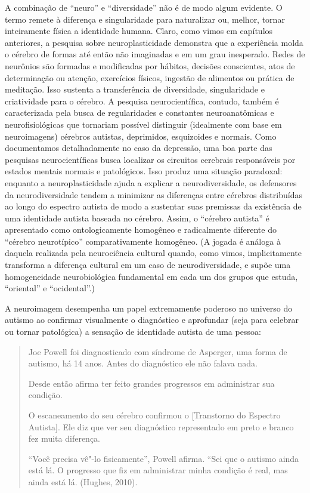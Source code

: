 A combinação de ``neuro'' e ``diversidade'' não é de modo algum
evidente. O termo remete à diferença e singularidade para naturalizar
ou, melhor, tornar inteiramente física a identidade humana. Claro, como
vimos em capítulos anteriores, a pesquisa sobre neuroplasticidade
demonstra que a experiência molda o cérebro de formas até então não
imaginadas e em um grau inesperado. Redes de neurônios são formadas e
modificadas por hábitos, decisões conscientes, atos de determinação ou
atenção, exercícios físicos, ingestão de alimentos ou prática de
meditação. Isso sustenta a transferência de diversidade, singularidade e
criatividade para o cérebro. A pesquisa neurocientífica, contudo, também
é caracterizada pela busca de regularidades e constantes neuroanatômicas
e neurofisiológicas que tornariam possível distinguir (idealmente com
base em neuroimagens) cérebros autistas, deprimidos, esquizoides e
normais. Como documentamos detalhadamente no caso da depressão, uma boa
parte das pesquisas neurocientíficas busca localizar os circuitos
cerebrais responsáveis por estados mentais normais e patológicos. Isso
produz uma situação paradoxal: enquanto a neuroplasticidade ajuda a
explicar a neurodiversidade, os defensores da neurodiversidade tendem a
minimizar as diferenças entre cérebros distribuídas ao longo do espectro
autista de modo a sustentar suas premissas da existência de uma
identidade autista baseada no cérebro. Assim, o ``cérebro autista'' é
apresentado como ontologicamente homogêneo e radicalmente diferente do
``cérebro neurotípico'' comparativamente homogêneo. (A jogada é análoga
à daquela realizada pela neurociência cultural quando, como vimos,
implicitamente transforma a diferença cultural em um caso de
neurodiversidade, e supõe uma homogeneidade neurobiológica fundamental
em cada um dos grupos que estuda, ``oriental'' e ``ocidental''.)

A neuroimagem desempenha um papel extremamente poderoso no universo do
autismo ao confirmar visualmente o diagnóstico e aprofundar (seja para
celebrar ou tornar patológica) a sensação de identidade autista de uma
pessoa:

\begin{quote}
Joe Powell foi diagnosticado com síndrome de Asperger, uma forma de
autismo, há 14 anos. Antes do diagnóstico ele não falava nada.

Desde então afirma ter feito grandes progressos em administrar sua
condição.

O escaneamento do seu cérebro confirmou o  {[}Transtorno do Espectro
Autista{]}. Ele diz que ver seu diagnóstico representado em preto e
branco fez muita diferença.

``Você precisa vê"-lo fisicamente'', Powell afirma. ``Sei que o autismo
ainda está lá. O progresso que fiz em administrar minha condição é real,
mas ainda está lá. (Hughes, 2010).
\end{quote}

